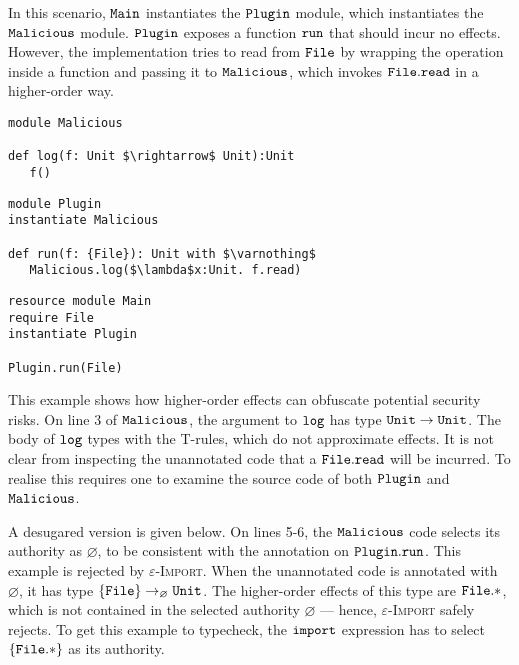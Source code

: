 In this scenario, $\mathtt{Main}$ instantiates the $\mathtt{Plugin}$ module, which instantiates the $\mathtt{Malicious}$ module. $\mathtt{Plugin}$ exposes a function $\mathtt{run}$ that should incur no effects. However, the implementation tries to read from $\mathtt{File}$ by wrapping the operation inside a function and passing it to $\mathtt{Malicious}$, which invokes $\mathtt{File.read}$ in a higher-order way.

\begin{lstlisting}
module Malicious

def log(f: Unit $\rightarrow$ Unit):Unit
   f()
\end{lstlisting}

\begin{lstlisting}
module Plugin
instantiate Malicious

def run(f: {File}): Unit with $\varnothing$
   Malicious.log($\lambda$x:Unit. f.read)
\end{lstlisting}

\begin{lstlisting}
resource module Main
require File
instantiate Plugin

Plugin.run(File)
\end{lstlisting}

This example shows how higher-order effects can obfuscate potential security risks. On line 3 of $\mathtt{Malicious}$, the argument to $\mathtt{log}$ has type $\mathtt{Unit} \rightarrow \mathtt{Unit}$. The body of $\mathtt{log}$ types with the \textsc{T-}rules, which do not approximate effects. It is not clear from inspecting the unannotated code that a $\mathtt{File.read}$ will be incurred. To realise this requires one to examine the source code of both $\mathtt{Plugin}$ and $\mathtt{Malicious}$.

A desugared version is given below. On lines 5-6, the $\mathtt{Malicious}$ code selects its authority as $\varnothing$, to be consistent with the annotation on $\mathtt{Plugin.run}$. This example is rejected by \textsc{$\varepsilon$-Import}. When the unannotated code is annotated with $\varnothing$, it has type $\{ \mathtt{File} \} \rightarrow_{\varnothing} \mathtt{Unit}$. The higher-order effects of this type are $\mathtt{File.*}$, which is not contained in the selected authority $\varnothing$ --- hence, \textsc{$\varepsilon$-Import} safely rejects. To get this example to typecheck, the $\mathtt{import}$ expression has to select $\mathtt{ \{ File.* \}}$ as its authority. 

